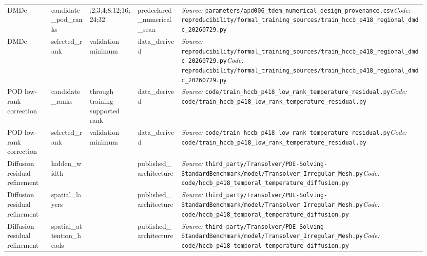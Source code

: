 \begin{longtable}{>{\raggedright\arraybackslash}p{2.7cm}>{\raggedright\arraybackslash}p{3.2cm}>{\raggedright\arraybackslash}p{1.5cm}>{\raggedright\arraybackslash}p{2.6cm}>{\raggedright\arraybackslash}p{8.0cm}}
DMDc & candidate\_\allowbreak{}pod\_\allowbreak{}ranks & 1;\allowbreak{}2;\allowbreak{}3;\allowbreak{}4;\allowbreak{}8;\allowbreak{}12;\allowbreak{}16;\allowbreak{}24;\allowbreak{}32 & predeclared\_\allowbreak{}numerical\_\allowbreak{}scan & \textit{Source:} \nolinkurl{parameters/apd006_tdem_numerical_design_provenance.csv}\newline \textit{Code:} \nolinkurl{reproducibility/formal_training_sources/train_hccb_p418_regional_dmdc_20260729.py} \\
DMDc & selected\_\allowbreak{}rank & validation minimum & data\_\allowbreak{}derived & \textit{Source:} \nolinkurl{reproducibility/formal_training_sources/train_hccb_p418_regional_dmdc_20260729.py}\newline \textit{Code:} \nolinkurl{reproducibility/formal_training_sources/train_hccb_p418_regional_dmdc_20260729.py} \\
POD low-rank correction & candidate\_\allowbreak{}ranks & 0 through training-supported rank & data\_\allowbreak{}derived & \textit{Source:} \nolinkurl{code/train_hccb_p418_low_rank_temperature_residual.py}\newline \textit{Code:} \nolinkurl{code/train_hccb_p418_low_rank_temperature_residual.py} \\
POD low-rank correction & selected\_\allowbreak{}rank & validation minimum & data\_\allowbreak{}derived & \textit{Source:} \nolinkurl{code/train_hccb_p418_low_rank_temperature_residual.py}\newline \textit{Code:} \nolinkurl{code/train_hccb_p418_low_rank_temperature_residual.py} \\
Diffusion residual refinement & hidden\_\allowbreak{}width & 256 & published\_\allowbreak{}architecture & \textit{Source:} \nolinkurl{third_party/Transolver/PDE-Solving-StandardBenchmark/model/Transolver_Irregular_Mesh.py}\newline \textit{Code:} \nolinkurl{code/hccb_p418_temporal_temperature_diffusion.py} \\
Diffusion residual refinement & spatial\_\allowbreak{}layers & 5 & published\_\allowbreak{}architecture & \textit{Source:} \nolinkurl{third_party/Transolver/PDE-Solving-StandardBenchmark/model/Transolver_Irregular_Mesh.py}\newline \textit{Code:} \nolinkurl{code/hccb_p418_temporal_temperature_diffusion.py} \\
Diffusion residual refinement & spatial\_\allowbreak{}attention\_\allowbreak{}heads & 8 & published\_\allowbreak{}architecture & \textit{Source:} \nolinkurl{third_party/Transolver/PDE-Solving-StandardBenchmark/model/Transolver_Irregular_Mesh.py}\newline \textit{Code:} \nolinkurl{code/hccb_p418_temporal_temperature_diffusion.py} \\

\end{longtable}
